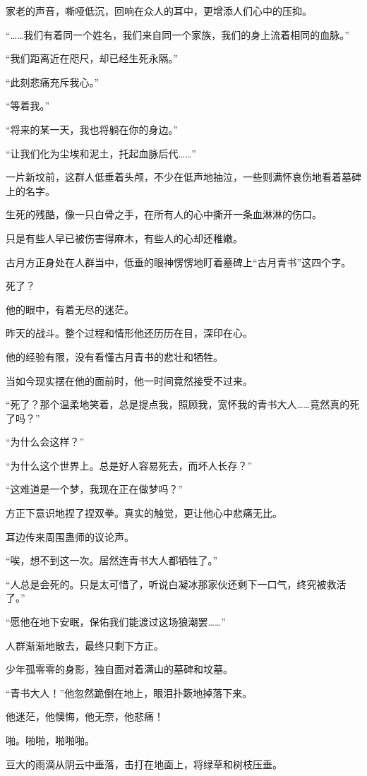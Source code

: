 \begin{this_body}
家老的声音，嘶哑低沉，回响在众人的耳中，更增添人们心中的压抑。

“……我们有着同一个姓名，我们来自同一个家族，我们的身上流着相同的血脉。”

“我们距离近在咫尺，却已经生死永隔。”

“此刻悲痛充斥我心。”

“等着我。”

“将来的某一天，我也将躺在你的身边。”

“让我们化为尘埃和泥土，托起血脉后代……”

一片新坟前，这群人低垂着头颅，不少在低声地抽泣，一些则满怀哀伤地看着墓碑上的名字。

生死的残酷，像一只白骨之手，在所有人的心中撕开一条血淋淋的伤口。

只是有些人早已被伤害得麻木，有些人的心却还稚嫩。

古月方正身处在人群当中，低垂的眼神愣愣地盯着墓碑上“古月青书”这四个字。

死了？

他的眼中，有着无尽的迷茫。

昨天的战斗。整个过程和情形他还历历在目，深印在心。

他的经验有限，没有看懂古月青书的悲壮和牺牲。

当如今现实摆在他的面前时，他一时间竟然接受不过来。

“死了？那个温柔地笑着，总是提点我，照顾我，宽怀我的青书大人……竟然真的死了吗？”

“为什么会这样？”

“为什么这个世界上。总是好人容易死去，而坏人长存？”

“这难道是一个梦，我现在正在做梦吗？”

方正下意识地捏了捏双拳。真实的触觉，更让他心中悲痛无比。

耳边传来周围蛊师的议论声。

“唉，想不到这一次。居然连青书大人都牺牲了。”

“人总是会死的。只是太可惜了，听说白凝冰那家伙还剩下一口气，终究被救活了。”

“愿他在地下安眠，保佑我们能渡过这场狼潮罢……”

人群渐渐地散去，最终只剩下方正。

少年孤零零的身影，独自面对着满山的墓碑和坟墓。

“青书大人！”他忽然跪倒在地上，眼泪扑簌地掉落下来。

他迷茫，他懊悔，他无奈，他悲痛！

啪。啪啪，啪啪啪。

豆大的雨滴从阴云中垂落，击打在地面上，将绿草和树枝压垂。


\end{this_body}
